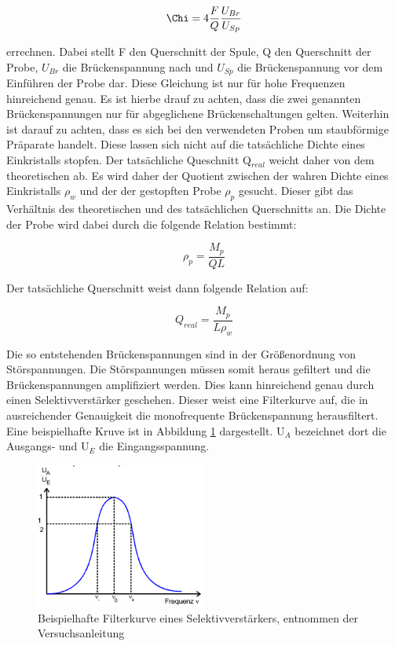 \begin{equation}
  \Chi = 4 \frac{F}{Q} \frac{U_{Br}}{U_{Sp}}
\end{equation}

errechnen.
Dabei stellt F den Querschnitt der Spule, Q den Querschnitt der Probe, $U_{Br}$ die Brückenspannung nach und $U_{Sp}$ die Brückenspannung vor dem Einführen der Probe dar.
Diese Gleichung ist nur für hohe Frequenzen hinreichend genau.
Es ist hierbe drauf zu achten, dass die zwei genannten Brückenspannungen nur für abgeglichene Brückenschaltungen gelten.
Weiterhin ist darauf zu achten, dass es sich bei den verwendeten Proben um staubförmige Präparate handelt.
Diese lassen sich nicht auf die tatsächliche Dichte eines Einkristalls stopfen.
Der tatsächliche Queschnitt Q$_{real}$ weicht daher von dem theoretischen ab.
Es wird daher der Quotient zwischen der wahren Dichte eines Einkristalls $\rho_w$ und der der gestopften Probe $\rho_p$ gesucht.
Dieser gibt das Verhältnis des theoretischen und des tatsächlichen Querschnitts an.
Die Dichte der Probe wird dabei durch die folgende Relation bestimmt:

\begin{equation}
  \rho_p = \frac{M_p}{Q L}
\end{equation}

Der tatsächliche Querschnitt weist dann folgende Relation auf:

\begin{equation}
  Q_{real} = \frac{M_p}{L \rho_w}
\end{equation}

Die so entstehenden Brückenspannungen sind in der Größenordnung von Störspannungen.
Die Störspannungen müssen somit heraus gefiltert und die Brückenspannungen amplifiziert werden.
Dies kann hinreichend genau durch einen Selektivverstärker geschehen.
Dieser weist eine Filterkurve auf, die in ausreichender Genauigkeit die monofrequente Brückenspannung herausfiltert.
Eine beispielhafte Kruve ist in Abbildung \ref{fig:theofilterkurve} dargestellt.
U$_A$ bezeichnet dort die Ausgangs- und U$_E$ die Eingangsspannung.

\begin{figure}
  \centering
  \includegraphics[width=0.5\textwidth]{images/theodiefilterkurve.png}
  \caption{Beispielhafte Filterkurve eines Selektivverstärkers, entnommen der Versuchsanleitung\cite[182]{sample}}
  \label{fig:theofilterkurve}
\end{figure}

